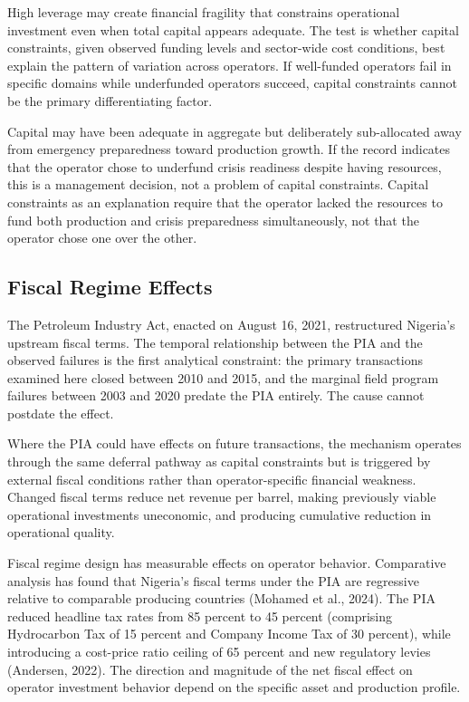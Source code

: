 \documentclass[twoside,fontset=lmodern]{mitthesis}
\begin{document}
High leverage may create financial fragility that constrains operational
investment even when total capital appears adequate. The test is whether
capital constraints, given observed funding levels and sector-wide cost
conditions, best explain the pattern of variation across operators. If
well-funded operators fail in specific domains while underfunded
operators succeed, capital constraints cannot be the primary
differentiating factor.

Capital may have been adequate in aggregate but deliberately
sub-allocated away from emergency preparedness toward production growth.
If the record indicates that the operator chose to underfund crisis
readiness despite having resources, this is a management decision, not a
problem of capital constraints. Capital constraints as an explanation
require that the operator lacked the resources to fund both production
and crisis preparedness simultaneously, not that the operator chose one
over the other.

\hypertarget{fiscal-regime-effects}{%
\subsection{Fiscal Regime Effects}\label{fiscal-regime-effects}}

The Petroleum Industry Act, enacted on August 16, 2021, restructured
Nigeria's upstream fiscal terms. The temporal relationship between the
PIA and the observed failures is the first analytical constraint: the
primary transactions examined here closed between 2010 and 2015, and the
marginal field program failures between 2003 and 2020 predate the PIA
entirely. The cause cannot postdate the effect.

Where the PIA could have effects on future transactions, the mechanism
operates through the same deferral pathway as capital constraints but is
triggered by external fiscal conditions rather than operator-specific
financial weakness. Changed fiscal terms reduce net revenue per barrel,
making previously viable operational investments uneconomic, and
producing cumulative reduction in operational quality.

Fiscal regime design has measurable effects on operator behavior.
Comparative analysis has found that Nigeria's fiscal terms under the PIA
are regressive relative to comparable producing countries (Mohamed et
al., 2024). The PIA reduced headline tax rates from 85 percent to 45
percent (comprising Hydrocarbon Tax of 15 percent and Company Income Tax
of 30 percent), while introducing a cost-price ratio ceiling of 65
percent and new regulatory levies (Andersen, 2022). The direction and
magnitude of the net fiscal effect on operator investment behavior
depend on the specific asset and production profile.
\end{document}
